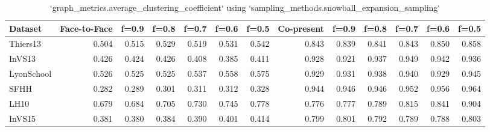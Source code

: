 \begin{table}[ht]
\begin{tabular}{lrrrrrrrrrrrr}
\hline
 Dataset    &   Face-to-Face &   f=0.9 &   f=0.8 &   f=0.7 &   f=0.6 &   f=0.5 &   Co-present &   f=0.9 &   f=0.8 &   f=0.7 &   f=0.6 &   f=0.5 \\
\hline
 Thiers13   &          0.504 &   0.515 &   0.529 &   0.519 &   0.531 &   0.542 &        0.843 &   0.839 &   0.841 &   0.843 &   0.850 &   0.858 \\
 InVS13     &          0.426 &   0.424 &   0.426 &   0.408 &   0.385 &   0.411 &        0.928 &   0.921 &   0.937 &   0.949 &   0.942 &   0.936 \\
 LyonSchool &          0.526 &   0.525 &   0.525 &   0.537 &   0.558 &   0.575 &        0.929 &   0.931 &   0.938 &   0.940 &   0.929 &   0.945 \\
 SFHH       &          0.282 &   0.289 &   0.301 &   0.311 &   0.312 &   0.328 &        0.944 &   0.946 &   0.946 &   0.952 &   0.956 &   0.964 \\
 LH10       &          0.679 &   0.684 &   0.705 &   0.730 &   0.745 &   0.778 &        0.776 &   0.777 &   0.789 &   0.815 &   0.841 &   0.904 \\
 InVS15     &          0.381 &   0.380 &   0.384 &   0.390 &   0.401 &   0.414 &        0.799 &   0.801 &   0.792 &   0.789 &   0.788 &   0.803 \\
\hline
\end{tabular}
\caption{`graph_metrics.average_clustering_coefficient` using `sampling_methods.snowball_expansion_sampling`}
\end{table}